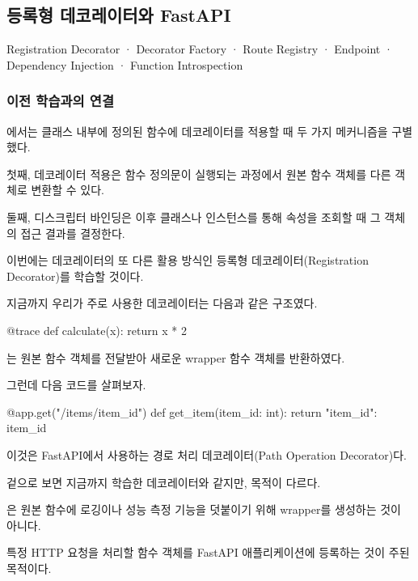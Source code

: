 

\subsection{등록형 데코레이터와 FastAPI}

Registration Decorator · Decorator Factory · Route Registry · Endpoint · Dependency Injection · Function Introspection

\subsubsection{이전 학습과의 연결}

에서는 클래스 내부에 정의된 함수에 데코레이터를 적용할 때 두 가지 메커니즘을 구별했다.

첫째, 데코레이터 적용은 함수 정의문이 실행되는 과정에서 원본 함수 객체를 다른 객체로 변환할 수 있다.

둘째, 디스크립터 바인딩은 이후 클래스나 인스턴스를 통해 속성을 조회할 때 그 객체의 접근 결과를 결정한다.

이번에는 데코레이터의 또 다른 활용 방식인 등록형 데코레이터(Registration Decorator)를 학습할 것이다.

지금까지 우리가 주로 사용한 데코레이터는 다음과 같은 구조였다.

\begin{dhkcode}
@trace
def calculate(x):
    return x * 2
\end{dhkcode}

는 원본 함수 객체를 전달받아 새로운 wrapper 함수 객체를 반환하였다.

그런데 다음 코드를 살펴보자.

\begin{dhkcode}
@app.get("/items/{item_id}")
def get_item(item_id: int):
    return {"item_id": item_id}
\end{dhkcode}

이것은 FastAPI에서 사용하는 경로 처리 데코레이터(Path Operation Decorator)다.

겉으로 보면 지금까지 학습한 데코레이터와 같지만, 목적이 다르다.

은 원본 함수에 로깅이나 성능 측정 기능을 덧붙이기 위해 wrapper를 생성하는 것이 아니다.

특정 HTTP 요청을 처리할 함수 객체를 FastAPI 애플리케이션에 등록하는 것이 주된 목적이다.

